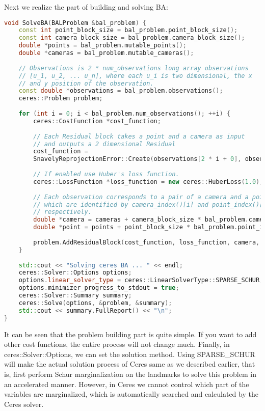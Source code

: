 Next we realize the part of building and solving BA:
\begin{lstlisting}[language=c++, caption=slambook2/ch9/SnavelyReprojectionError.cpp (part)]
void SolveBA(BALProblem &bal_problem) {
	const int point_block_size = bal_problem.point_block_size();
	const int camera_block_size = bal_problem.camera_block_size();
	double *points = bal_problem.mutable_points();
	double *cameras = bal_problem.mutable_cameras();
	
	// Observations is 2 * num_observations long array observations
	// [u_1, u_2, ... u_n], where each u_i is two dimensional, the x
	// and y position of the observation.
	const double *observations = bal_problem.observations();
	ceres::Problem problem;
	
	for (int i = 0; i < bal_problem.num_observations(); ++i) {
		ceres::CostFunction *cost_function;
		
		// Each Residual block takes a point and a camera as input
		// and outputs a 2 dimensional Residual
		cost_function = 
		SnavelyReprojectionError::Create(observations[2 * i + 0], observations[2 * i + 1]);
		
		// If enabled use Huber's loss function.
		ceres::LossFunction *loss_function = new ceres::HuberLoss(1.0);
		
		// Each observation corresponds to a pair of a camera and a point
		// which are identified by camera_index()[i] and point_index()[i]
		// respectively.
		double *camera = cameras + camera_block_size * bal_problem.camera_index()[i];
		double *point = points + point_block_size * bal_problem.point_index()[i];
		
		problem.AddResidualBlock(cost_function, loss_function, camera, point);
	}
	
	std::cout << "Solving ceres BA ... " << endl;
	ceres::Solver::Options options;
	options.linear_solver_type = ceres::LinearSolverType::SPARSE_SCHUR;
	options.minimizer_progress_to_stdout = true;
	ceres::Solver::Summary summary;
	ceres::Solve(options, &problem, &summary);
	std::cout << summary.FullReport() << "\n";
}
\end{lstlisting} 

It can be seen that the problem building part is quite simple. If you want to add other cost functions, the entire process will not change much. Finally, in ceres::Solver::Options, we can set the solution method. Using SPARSE\_SCHUR will make the actual solution process of Ceres same as we described earlier, that is, first perform Schur marginalization on the landmarks to solve this problem in an accelerated manner. However, in Ceres we cannot control which part of the variables are marginalized, which is automatically searched and calculated by the Ceres solver.

